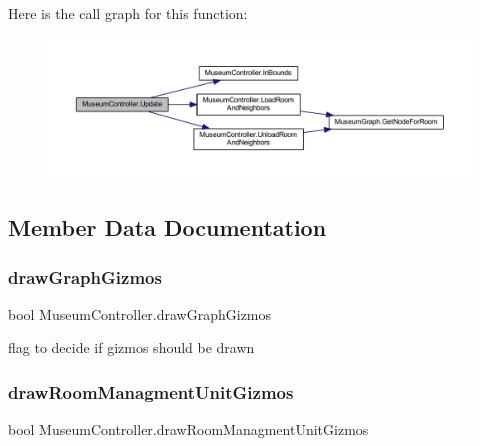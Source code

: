 Here is the call graph for this function\+:
\nopagebreak
\begin{figure}[H]
\begin{center}
\leavevmode
\includegraphics[width=350pt]{class_museum_controller_adfeaf699686c1a1aad33bd585db636b9_cgraph}
\end{center}
\end{figure}


\subsection{Member Data Documentation}
\mbox{\label{class_museum_controller_a1a767943d586c25b0fe68bafd35276d5}} 
\subsubsection{\texorpdfstring{draw\+Graph\+Gizmos}{drawGraphGizmos}}
{\footnotesize\ttfamily bool Museum\+Controller.\+draw\+Graph\+Gizmos\hspace{0.3cm}{\ttfamily [private]}}



flag to decide if gizmos should be drawn 

\mbox{\label{class_museum_controller_a4ee410c0d4bf59e30d0374537fc28dcb}} 
\subsubsection{\texorpdfstring{draw\+Room\+Managment\+Unit\+Gizmos}{drawRoomManagmentUnitGizmos}}
{\footnotesize\ttfamily bool Museum\+Controller.\+draw\+Room\+Managment\+Unit\+Gizmos\hspace{0.3cm}{\ttfamily [private]}}




